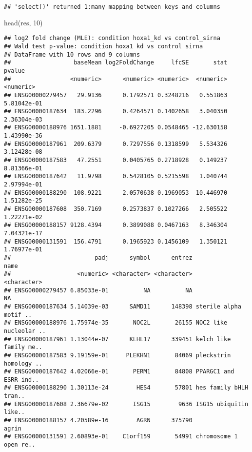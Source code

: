 \documentclass[
]{article}
\newenvironment{Shaded}{\begin{snugshade}}{\end{snugshade}}
\newcommand{\DecValTok}[1]{\textcolor[rgb]{0.00,0.00,0.81}{#1}}
\newcommand{\FunctionTok}[1]{\textcolor[rgb]{0.00,0.00,0.00}{#1}}
\newcommand{\NormalTok}[1]{#1}
\begin{document}
\begin{verbatim}
## 'select()' returned 1:many mapping between keys and columns
\end{verbatim}

\begin{Shaded}
\begin{Highlighting}[]
\FunctionTok{head}\NormalTok{(res, }\DecValTok{10}\NormalTok{)}
\end{Highlighting}
\end{Shaded}

\begin{verbatim}
## log2 fold change (MLE): condition hoxa1_kd vs control_sirna 
## Wald test p-value: condition hoxa1 kd vs control sirna 
## DataFrame with 10 rows and 9 columns
##                  baseMean log2FoldChange     lfcSE       stat      pvalue
##                 <numeric>      <numeric> <numeric>  <numeric>   <numeric>
## ENSG00000279457   29.9136      0.1792571 0.3248216   0.551863 5.81042e-01
## ENSG00000187634  183.2296      0.4264571 0.1402658   3.040350 2.36304e-03
## ENSG00000188976 1651.1881     -0.6927205 0.0548465 -12.630158 1.43990e-36
## ENSG00000187961  209.6379      0.7297556 0.1318599   5.534326 3.12428e-08
## ENSG00000187583   47.2551      0.0405765 0.2718928   0.149237 8.81366e-01
## ENSG00000187642   11.9798      0.5428105 0.5215598   1.040744 2.97994e-01
## ENSG00000188290  108.9221      2.0570638 0.1969053  10.446970 1.51282e-25
## ENSG00000187608  350.7169      0.2573837 0.1027266   2.505522 1.22271e-02
## ENSG00000188157 9128.4394      0.3899088 0.0467163   8.346304 7.04321e-17
## ENSG00000131591  156.4791      0.1965923 0.1456109   1.350121 1.76977e-01
##                        padj      symbol      entrez                   name
##                   <numeric> <character> <character>            <character>
## ENSG00000279457 6.85033e-01          NA          NA                     NA
## ENSG00000187634 5.14039e-03      SAMD11      148398 sterile alpha motif ..
## ENSG00000188976 1.75974e-35       NOC2L       26155 NOC2 like nucleolar ..
## ENSG00000187961 1.13044e-07      KLHL17      339451 kelch like family me..
## ENSG00000187583 9.19159e-01     PLEKHN1       84069 pleckstrin homology ..
## ENSG00000187642 4.02066e-01       PERM1       84808 PPARGC1 and ESRR ind..
## ENSG00000188290 1.30113e-24        HES4       57801 hes family bHLH tran..
## ENSG00000187608 2.36679e-02       ISG15        9636 ISG15 ubiquitin like..
## ENSG00000188157 4.20589e-16        AGRN      375790                  agrin
## ENSG00000131591 2.60893e-01    C1orf159       54991 chromosome 1 open re..
\end{verbatim}
\end{document}
